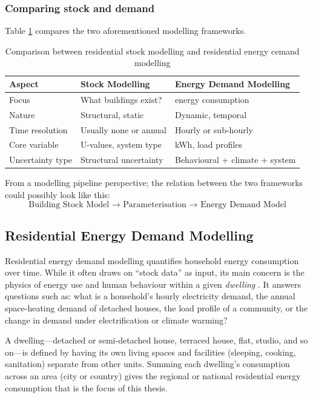\subsubsection*{Comparing stock and demand}
Table \ref{tab:modelling_framework_comparison} compares the two aforementioned modelling frameworks. 

\begin{table}[ht]
\centering
\caption{Comparison between residential stock modelling and residential energy cemand modelling}
\label{tab:modelling_framework_comparison}
\begin{tabular}{p{3cm} p{5cm} p{5cm}}
\toprule
\textbf{Aspect} & \textbf{Stock Modelling} & \textbf{Energy Demand Modelling} \\
\midrule
Focus & What buildings exist? & energy consumption \\
Nature & Structural, static & Dynamic, temporal \\
Time resolution & Usually none or annual & Hourly or sub-hourly \\
Core variable & U-values, system type & kWh, load profiles \\
Uncertainty type & Structural uncertainty & Behavioural + climate + system \\
\bottomrule
\end{tabular}
\end{table}
From a modelling pipeline perspective; the relation between the two frameworks could possibly look like this:
$$ \text{Building Stock Model  →  Parameterisation  →  Energy Demand Model} $$


\subsection{Residential Energy Demand Modelling}\label{sec:residential_eED_modelling}
Residential energy demand modelling quantifies household energy consumption over time. While it often draws on ``stock data'' as input, its main concern is the physics of energy use and human behaviour within a given \textit{dwelling} \cite{zhangModelingManagingResidential2025}. It answers questions such as: what is a household's hourly electricity demand, the annual space-heating demand of detached houses, the load profile of a community, or the change in demand under electrification or climate warming?

A dwelling—detached or semi-detached house, terraced house, flat, studio, and so on—is defined by having its own living spaces and facilities (sleeping, cooking, sanitation) separate from other units. Summing each dwelling's consumption across an area (city or country) gives the regional or national residential energy consumption that is the focus of this thesis.

